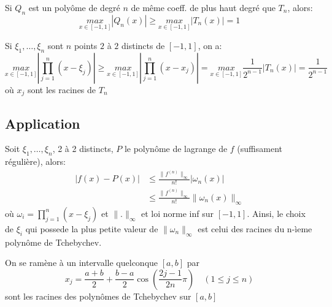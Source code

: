 \begin{prop}
   Si $Q_n$ est un polyôme de degré  $n$ de même coeff. de plus haut degré que  $T_n$, alors:
   \[
       \underset{x \in [-1, 1]}{max} |Q_n(x)| \ge \underset{x \in [-1, 1]}{max} |T_n(x)| = 1
   \] 
\end{prop}

\begin{corollary}
    Si $\xi_1, \ldots, \xi_n$  sont $n$ points  $2$ à  $2$ distincts de  $[-1, 1]$, on a:
     \[
         \underset{x \in [-1, 1]}{max} \left| \prod_{j=1}^{n} (x - \xi_{j})  \right| \ge \underset{x \in [-1, 1]}{max} \left| \prod_{j=1}^{n} (x - x_j)  \right| = \underset{x \in [-1, 1]}{max} \frac{1}{2^{n-1}} |T_n(x)| = \frac{1}{2^{n-1}}
    \] 
    où $x_j$ sont les racines de  $T_n$
\end{corollary}

\subsection{Application}
Soit $\xi_1, \ldots, \xi_n$, 2 à 2 distincts, $P$ le polynôme de lagrange de  $f$ (suffisament régulière), alors:
 \begin{align*}
     |f(x) - P(x)| &\le \frac{\|f^{(n)}\|_{\infty}}{n!}|\omega_n(x)|\\
                   &\le \frac{\|f^{(n)}\|_{\infty}}{n!}\|\omega_n(x)\|_{\infty}
\end{align*}
où $\omega_i = \prod_{j=1}^{n} (x - \xi_j) $ et $\| . \|_{\infty}$ et loi norme inf sur $[-1, 1]$. Ainsi, le choix de $\xi_i$ qui possede la plus petite valeur de  $\| \omega_n\|_{\infty}$ est celui des racines du n-ìeme polynôme de Tchebychev.

\begin{remark}
    On se ramène à un intervalle quelconque $[a, b]$ par 
    \[
    x_j = \frac{a + b}{2} + \frac{b - a}{2}\cos(\frac{2j - 1}{2n}\pi) \quad (1 \le j \le n)
    \] 
    sont les racines des polynômes de Tchebychev sur $[a, b]$
\end{remark}

